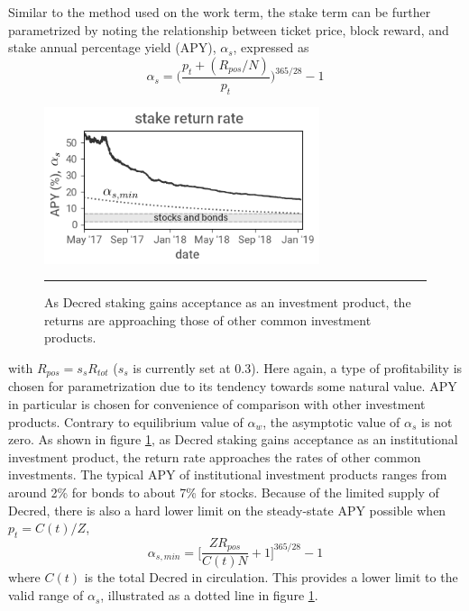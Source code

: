 \documentclass[a4paper,12pt]{article}
\begin{document}
Similar to the method used on the work term, the stake term can be further parametrized by noting the relationship between ticket price, block reward, and stake annual percentage yield (APY), $ \alpha_s $, expressed as
%
\begin{equation}
\alpha_s = \bigg( \frac{ p_t + (R_{pos} / N) }{ p_t } \bigg)^{365/28} - 1
\end{equation}
%
\begin{figure}[!t]
	\begin{center}
	\includegraphics[width=3.18in]{stakereturn}
\begin{minipage}[t]{0.85\textwidth}
	\caption{As Decred staking gains acceptance as an investment product, the returns are approaching those of other common investment products. \label{stakereturnfig}}
	\end{minipage}
  	\end{center}
	\hrule
	\vspace{5pt}
\end{figure}
%
with $ R_{pos} = s_s R_{tot} $ ($ s_s $ is currently set at 0.3). Here again, a type of profitability is chosen for parametrization due to its tendency towards some natural value. APY in particular is chosen for convenience of comparison with other investment products. Contrary to equilibrium value of $ \alpha_w $, the asymptotic value of $ \alpha_s $ is not zero. As shown in figure \ref{stakereturnfig}, as Decred staking gains acceptance as an institutional investment product, the return rate approaches the rates of other common investments. The typical APY of institutional investment products ranges from around 2\% for bonds to about 7\% for stocks. Because of the limited supply of Decred, there is also a hard lower limit on the steady-state APY possible when $ p_t = C(t) / Z $,
%
\begin{equation}
\alpha_{s, min} = \Big[ \frac{ Z R_{pos} }{ C(t) N } + 1 \Big]^{365/28} - 1
\end{equation}
%
where $ C(t) $ is the total Decred in circulation. This provides a lower limit to the valid range of $ \alpha_s $, illustrated as a dotted line in figure \ref{stakereturnfig}. 
\end{document}
